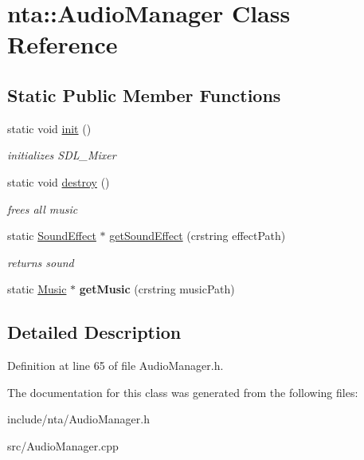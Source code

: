 \hypertarget{classnta_1_1AudioManager}{}\section{nta\+:\+:Audio\+Manager Class Reference}
\label{classnta_1_1AudioManager}
\subsection*{Static Public Member Functions}
\begin{DoxyCompactItemize}
\item 
\mbox{\label{classnta_1_1AudioManager_a4da570a6cee16bd6450031f7910057fd}} 
static void \hyperlink{classnta_1_1AudioManager_a4da570a6cee16bd6450031f7910057fd}{init} ()
\begin{DoxyCompactList}\small\item\em initializes S\+D\+L\+\_\+\+Mixer \end{DoxyCompactList}\item 
\mbox{\label{classnta_1_1AudioManager_aa337e5cc1825c6e2b971e1fc173b17ce}} 
static void \hyperlink{classnta_1_1AudioManager_aa337e5cc1825c6e2b971e1fc173b17ce}{destroy} ()
\begin{DoxyCompactList}\small\item\em frees all music \end{DoxyCompactList}\item 
\mbox{\label{classnta_1_1AudioManager_a131e8ec62c63fd9a07a77d833b02b598}} 
static \hyperlink{classnta_1_1SoundEffect}{Sound\+Effect} $\ast$ \hyperlink{classnta_1_1AudioManager_a131e8ec62c63fd9a07a77d833b02b598}{get\+Sound\+Effect} (crstring effect\+Path)
\begin{DoxyCompactList}\small\item\em returns sound \end{DoxyCompactList}\item 
\mbox{\label{classnta_1_1AudioManager_adb0a0f0efb072f57430835c849caaa39}} 
static \hyperlink{classnta_1_1Music}{Music} $\ast$ {\bfseries get\+Music} (crstring music\+Path)
\end{DoxyCompactItemize}


\subsection{Detailed Description}


Definition at line 65 of file Audio\+Manager.\+h.



The documentation for this class was generated from the following files\+:\begin{DoxyCompactItemize}
\item 
include/nta/Audio\+Manager.\+h\item 
src/Audio\+Manager.\+cpp\end{DoxyCompactItemize}
